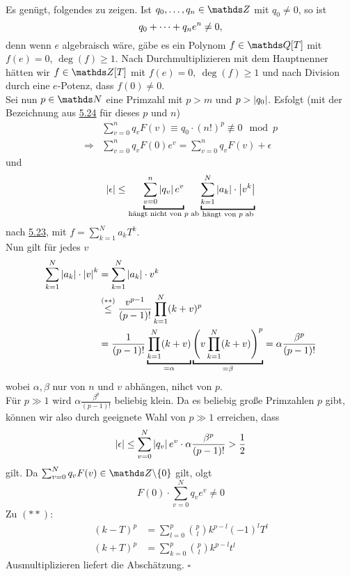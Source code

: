 \\
Es genügt, folgendes zu zeigen.
Ist $q_0\dt{,}q_n\in \Z$ mit $q_0\neq 0$, so ist
\[
q_0+ \dots +q_ne^n \neq 0,
\]
denn wenn $e$ algebraisch wäre, gäbe es ein Polynom $f\in \Q[T]$ mit $f(e)=0$, $\deg(f)\ge 1$.
Nach Durchmultiplizieren mit dem Hauptnenner hätten wir $f\in \Z[T]$ mit $f(e)=0,~\deg(f)\ge 1$ und nach Division durch eine $e$-Potenz, dass $f(0)\neq 0$.\\
Sei nun $p\in \N$ eine Primzahl mit $p>m$ und $p>\left\vert q_0\right\vert$.
Esfolgt (mit der Bezeichnung aus \hyperref[sub:bemerkung_nullstellen]{5.24} für dieses $p$ und $n$)
\begin{equation*}
\begin{aligned}
	&\sum_{v=0}^{n}q_vF(v)\equiv q_0\cdot (n!)^p\not\equiv 0 \mod{p}\\
	\Rightarrow &\sum_{v=0}^n q_vF(0)e^v=\sum_{v=0}^{n}q_vF(v)+\epsilon
\end{aligned}
\end{equation*}
und
\[
\abs{\epsilon}\le \underbracket{\sum_{v=0}^{n}\abs{q_v}e^v}_{\text{hängt nicht von $p$ ab}}\underbracket{\sum_{k=1}^{N}\abs{a_k}\cdot\abs{v^k}}_{\text{hängt von $p$ ab}}
\]
nach \hyperref[sub:lemma_14]{5.23}, mit $f=\sum_{k=1}^{N}a_kT^k$.\\
Nun gilt für jedes $v$
\begin{equation*}
\begin{aligned}
	\sum_{k=1}^{N}\abs{a_k}\cdot\abs{v}^k &= \sum_{k=1}^{N}\abs{a_k}\cdot v^k\\
	&\stackrel{(\ast\ast)}{\le} \frac{v^{p-1}}{(p-1)!}\prod_{k=1}^N(k+v)^p\\
	&= \frac{1}{(p-1)!}\underbracket{\prod_{k=1}^{N}(k+v)}_{=\alpha}\underbracket{\enbrace{v\prod_{k=1}^{N}(k+v)}^p}_{=\beta} = \alpha\frac{\beta^p}{(p-1)!}
\end{aligned}
\end{equation*}
wobei $\alpha, \beta$ nur von $n$ und $v$ abhängen, nihct von $p$.\\
Für $p\gg 1$ wird $\alpha\frac{\beta^p}{(p-1)!}$ beliebig klein.
Da es beliebig große Primzahlen $p$ gibt, können wir also durch geeignete Wahl von $p\gg 1$ erreichen, dass
\[
\left\vert\epsilon\right\vert\le \sum_{v=0}^{N}\left\vert q_v\right\vert e^v\cdot \alpha\frac{\beta^p}{(p-1)!}>\frac{1}{2}
\]
gilt.
Da $\sum_{v=0}^{N}q_vF(v)\in \Z\backslash\{0\}$ gilt, olgt
\[
F(0)\cdot \sum_{v=0}^{N}q_ve^v\neq 0
\]
Zu $(\ast\ast)$:
\begin{equation*}
\begin{aligned}
	(k-T)^p &= \sum_{l=0}^{p}\binom{p}{l}k^{p-l}(-1)^lT^l\\
	(k+T)^p &= \sum_{k=0}^{p}\binom{p}{l}k^{p-l}t^l
\end{aligned}
\end{equation*}
Ausmultiplizieren liefert die Abschätzung.
\hfill $\square$\\

